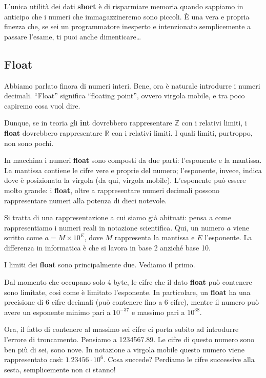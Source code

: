 	L'unica utilità dei dati \textbf{short} è di risparmiare memoria quando sappiamo in anticipo che i numeri che immagazzineremo sono piccoli. \`E una vera e propria finezza che, se sei un programmatore inesperto e intenzionato semplicemente a passare l'esame, ti puoi anche dimenticare\ldots
	
	
	
	\subsection{Float}
	Abbiamo parlato finora di numeri interi. Bene, ora è naturale introdurre i numeri decimali. ``Float'' significa ``floating point'', ovvero virgola mobile, e tra poco capiremo cosa vuol dire.
	
	Dunque, se in teoria gli \textbf{int} dovrebbero rappresentare $\mathbb{Z}$ con i relativi limiti, i \textbf{float} dovrebbero rappresentare $\mathbb{R}$ con i relativi limiti. I quali limiti, purtroppo, non sono pochi. 
	
	In macchina i numeri \textbf{float} sono composti da due parti: l'esponente e la mantissa. La mantissa contiene le cifre vere e proprie del numero; l'esponente, invece, indica dove è posizionata la virgola (da qui, virgola mobile). L'esponente può essere molto grande: i \textbf{float}, oltre a rappresentare numeri decimali possono rappresentare numeri alla potenza di dieci notevole.  
	
	Si tratta di una rappresentazione a cui siamo già abituati: pensa a come rappresentiamo i numeri reali in notazione scientifica. Qui, un numero $a$ viene scritto come $a = M \times 10^E$, dove $M$ rappresenta la mantissa e $E$ l'esponente. La differenza in informatica è che si lavora in base 2 anziché base 10. 
	
	I limiti dei \textbf{float} sono principalmente due. Vediamo il primo.
	
	Dal momento che occupano solo 4 byte, le cifre che il dato \textbf{float} può contenere sono limitate, così come è limitato l'esponente. In particolare, un \textbf{float} ha una precisione di 6 cifre decimali (può contenere fino a 6 cifre), mentre il numero può avere un esponente minimo pari a $10^{-37}$ e massimo pari a $10^{38}$.
	
	Ora, il fatto di contenere al massimo sei cifre ci porta subito ad introdurre l'errore di troncamento. Pensiamo a 1234567.89. Le cifre di questo numero sono ben più di sei, sono nove. In notazione a virgola mobile questo numero viene rappresentato così: $1.23456\cdotp10^6$. Cosa succede? Perdiamo le cifre successive alla sesta, semplicemente non ci stanno!
	
